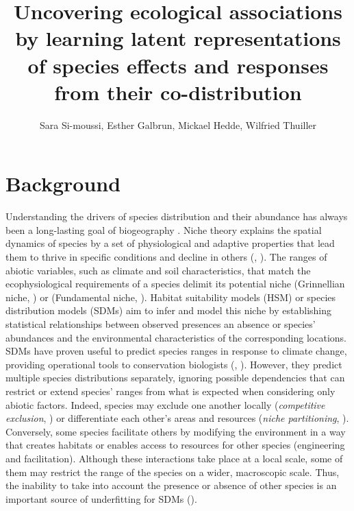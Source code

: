 \documentclass[10pt,a4paper]{article}
\title{Uncovering ecological associations by learning latent representations of species effects and responses from their co-distribution}
\author{Sara Si-moussi, Esther Galbrun, Mickael Hedde, Wilfried Thuiller}
\begin{document}
\maketitle

\section{Background}
Understanding the drivers of species distribution and their abundance has always been a long-lasting goal of biogeography \cite{humboldt1805essai}. Niche theory explains the spatial dynamics of species by a set of physiological and adaptive properties that lead them to thrive in specific conditions and decline in others (\cite{chase2003ecological}, \cite{pulliam2000relationship}). The ranges of abiotic variables, such as climate and soil characteristics, that match the ecophysiological requirements of a species delimit its potential niche (Grinnellian niche, \cite{grinnell1917niche}) or (Fundamental niche, \cite{hutchinson1957multivariate}).  Habitat suitability models (HSM) or species distribution models (SDMs) \cite{guisan2017habitat} aim to infer and model this niche by establishing statistical relationships between observed presences an absence or species' abundances and the environmental characteristics of the corresponding locations. \\

SDMs have proven useful to predict species ranges in response to climate change, providing operational tools to conservation biologists (\cite{guisan2005predicting}, \cite{elith2009species}). However, they predict multiple species distributions separately, ignoring possible dependencies that can restrict or extend species' ranges from what is expected when considering only abiotic factors.  Indeed, species may exclude one another locally (\textit{competitive exclusion}, \cite{hardin1960competitive}) or differentiate each other’s areas and resources (\textit{niche partitioning}, \cite{schoener1974resource}). Conversely, some species facilitate others by modifying the environment in a way that creates habitats or enables access to resources for other species (engineering and facilitation).  Although these interactions take place at a local scale, some of them may restrict the range of the species on a wider, macroscopic scale.  Thus, the inability to take into account the presence or absence of other species is an important source of underfitting for SDMs (\cite{wisz2013role}). \\
\end{document}
